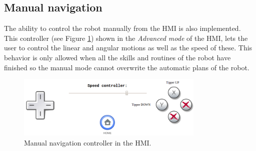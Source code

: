 
    \subsection{Manual navigation} %
    \label{sub:mr_manual_navigation}
    The ability to control the robot manually from the HMI is also implemented.
    This controller (see Figure \ref{fig:mr_manual_navigation}) shown in the \emph{Advanced mode} of the HMI, lets the user to control the linear and angular motions as well as the speed of these.
    This behavior is only allowed when all the skills and routines of the robot have finished so the manual mode cannot overwrite the automatic plans of the robot.

    \begin{figure}[tb]
        \centering
        \includegraphics[width=0.8\textwidth]{figs/manual_navigation}
        \caption{Manual navigation controller in the HMI.}
        \label{fig:mr_manual_navigation}
    \end{figure}
    

